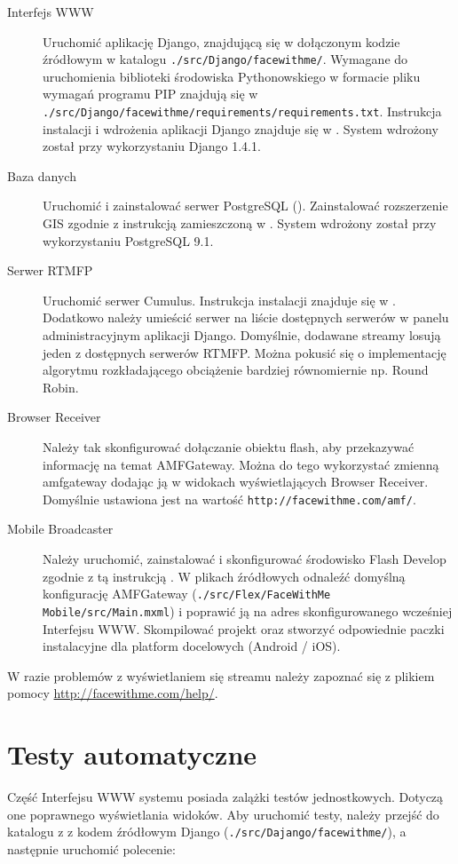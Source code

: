\begin{description}
    \item[Interfejs WWW] Uruchomić aplikację Django, znajdującą się w dołączonym kodzie źródłowym w katalogu \texttt{./src/Django/facewithme/}. Wymagane do uruchomienia biblioteki środowiska Pythonowskiego w formacie pliku wymagań programu PIP znajdują się w \texttt{./src/Django/facewithme/requirements/requirements.txt}. Instrukcja instalacji i wdrożenia aplikacji Django znajduje się w \cite{DjangoDocs}. System wdrożony został przy wykorzystaniu Django 1.4.1.
    \item[Baza danych] Uruchomić i zainstalować serwer PostgreSQL (\cite{PostgreSQL}). Zainstalować rozszerzenie GIS zgodnie z instrukcją zamieszczoną w \cite{DjangoPostGIS}. System wdrożony został przy wykorzystaniu PostgreSQL 9.1.
    \item[Serwer RTMFP] Uruchomić serwer Cumulus. Instrukcja instalacji znajduje się w \cite{CumulusInstall}. Dodatkowo należy umieścić serwer na liście dostępnych serwerów w panelu administracyjnym aplikacji Django. Domyślnie, dodawane streamy losują jeden z dostępnych serwerów RTMFP. Można pokusić się o implementację algorytmu rozkładającego obciążenie bardziej równomiernie np. Round Robin.
    \item[Browser Receiver] Należy tak skonfigurować dołączanie obiektu flash, aby przekazywać informację na temat AMFGateway. Można do tego wykorzystać zmienną amfgateway dodając ją w widokach wyświetlających Browser Receiver. Domyślnie ustawiona jest na wartość \texttt{http://facewithme.com/amf/}.
    \item[Mobile Broadcaster] Należy uruchomić, zainstalować i skonfigurować środowisko Flash Develop zgodnie z tą instrukcją \cite{flashDevelopConfig}. W plikach źródłowych odnaleźć domyślną konfigurację AMFGateway (\texttt{./src/Flex/FaceWithMe Mobile/src/Main.mxml}) i poprawić ją na adres skonfigurowanego wcześniej Interfejsu WWW. Skompilować projekt oraz stworzyć odpowiednie paczki instalacyjne dla platform docelowych (Android / iOS).
\end{description}

W razie problemów z wyświetlaniem się streamu należy zapoznać się z plikiem pomocy \url{http://facewithme.com/help/}.

\section{Testy automatyczne}

Część Interfejsu WWW systemu posiada zalążki testów jednostkowych. Dotyczą one poprawnego wyświetlania widoków. Aby uruchomić testy, należy przejść do katalogu z z kodem źródłowym Django (\texttt{./src/Dajango/facewithme/}), a następnie uruchomić polecenie:

